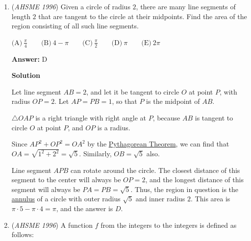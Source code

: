 \begin{enumerate}
 A cube has $12$ edges:  Four on the top face, four on the bottom face, and four that connect the top face to the bottom face.

 A cube has $6$ square faces, each of which has $2$ facial diagonals, for a total of $6\cdot 2 = 12$.

 A cube has $4$ spacial diagonals:  each diagonal goes from one of the bottom vertices to the "opposite" top vertex.

 Thus, there are $12 + 12 + 4 = 28$ segments, and the answer is $\boxed{D}$.

 


	\item (\textit{AHSME 1996}) Given a circle of radius $2$, there are many line segments of length $2$ that are tangent to the circle at their midpoints. Find the area of the region consisting of all such line segments.


 $\text{(A)}\ \frac{\pi} 4\qquad\text{(B)}\ 4-\pi\qquad\text{(C)}\ \frac{\pi} 2\qquad\text{(D)}\ \pi\qquad\text{(E)}\ 2\pi$

 \textbf{Answer: }D



\textbf{Solution}

Let line segment $AB = 2$, and let it be tangent to circle $O$ at point $P$, with radius $OP = 2$.  Let $AP = PB = 1$, so that $P$ is the midpoint of $AB$.

 $\triangle OAP$ is a right triangle with right angle at $P$, because $AB$ is tangent to circle $O$ at point $P$, and $OP$ is a radius.

 Since $AP^2 + OP^2 = OA^2$ by the \href{https://artofproblemsolving.com/wiki/index.php?title=Pythagorean\_Theorem}{Pythagorean Theorem}, we can find that $OA = \sqrt{1^2 + 2^2} = \sqrt{5}$. Similarly, $OB = \sqrt{5}$ also.

 Line segment $APB$ can rotate around the circle.  The closest distance of this segment to the center will always be $OP = 2$, and the longest distance of this segment will always be $PA = PB = \sqrt{5}$.  Thus, the region in question is the \href{https://artofproblemsolving.com/wiki/index.php?title=Annulus}{annulus} of a circle with outer radius $\sqrt{5}$ and inner radius $2$.  This area is $\pi \cdot 5 - \pi \cdot 4 = \pi$, and the answer is $\boxed{D}$.

 


	\item (\textit{AHSME 1996}) A function $f$ from the integers to the integers is defined as follows: 



\end{enumerate}
